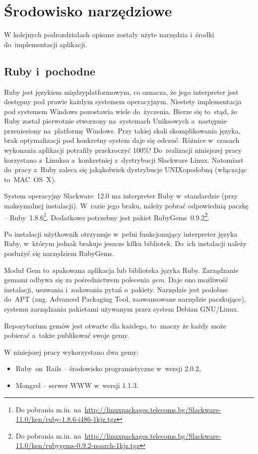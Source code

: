 \documentclass[a4paper,12pt,oneside]{report}
\begin{document}
\section{Środowisko narzędziowe}
\label{sec:srodowisko}
W kolejnych podrozdziałach opisane zostały użyte narzędzia i~środki do~implementacji aplikacji.

\subsection{Ruby i~pochodne}
\label{sub:ruby-etc}
Ruby jest językiem międzyplatformowym, co oznacza, że jego interpreter jest dostępny pod prawie każdym systemem operacyjnym. Niestety implementacja pod systemem Windows pozostawia wiele do~życzenia. Bierze się to~stąd, że Ruby został pierwotnie stworzony na~systemach Uniksowych a~następnie przeniesiony na~platformę Windows. Przy takiej skali skomplikowania języka, brak optymalizacji pod konkretny system daje się odczuć. Różnice w~czasach wykonania aplikacji potrafiły przekroczyć 100\%! Do~realizacji niniejszej pracy korzystano z~Linuksa a~konkretniej z~dystrybucji Slackware Linux. Natomiast do~pracy z~Ruby zaleca się jakąkolwiek dystrybucje UNIXopodobną (włączając to~MAC~OS~X).

System operacyjny Slackware~12.0 ma interpreter Ruby w~standardzie (przy maksymalnej instalacji). W~razie jego braku, należy pobrać odpowiednią paczkę -- Ruby~1.8.6\footnote{Do pobrania m.in. na~\url{http://linuxpackages.telecoms.bg/Slackware-11.0/ken/ruby-1.8.6-i486-1kjz.tgz}}. Dodatkowo potrzebny jest pakiet RubyGems~0.9.2\footnote{Do pobrania m.in. na~\url{http://linuxpackages.telecoms.bg/Slackware-11.0/ken/rubygems-0.9.2-noarch-1kjz.tgz}}.

Po instalacji użytkownik otrzymuje w~pełni funkcjonujący interpreter języka Ruby, w~którym jednak brakuje jeszcze kilku bibliotek. Do~ich instalacji należy posłużyć się narzędziem RubyGems.

Moduł Gem to~spakowana aplikacja lub biblioteka języka Ruby. Zarządzanie gemami odbywa się za pośrednictwem polecenia \emph{gem}. Daje ono możliwość instalacji, usuwania i~zadawania pytań o~pakiety. Narzędzie jest podobne do~APT (ang. Advanced Packaging Tool, zaawansowane narzędzie paczkujące), systemu zarządzania pakietami używanym przez system Debian GNU/Linux.

Repozytorium gemów jest otwarte dla każdego, to~znaczy że każdy może pobierać a~także publikować swoje gemy.

W niniejszej pracy wykorzystano dwa gemy:
\begin{itemize}
  \item Ruby~on~Rails -- środowisko programistyczne w~wersji 2.0.2,
  \item Mongrel -- serwer WWW w~wersji 1.1.3.
\end{itemize}
\end{document}
